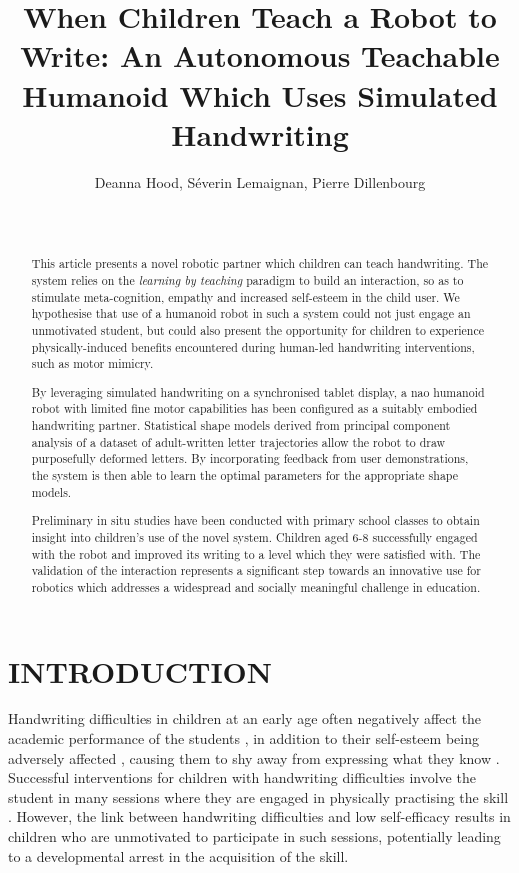 \documentclass{sig-alternate}
\title{When Children Teach a Robot to Write: An Autonomous Teachable Humanoid Which Uses Simulated Handwriting
}
\author{
\alignauthor
Deanna Hood, Séverin Lemaignan, Pierre Dillenbourg\\
   \affaddr{Computer-Human Interaction in Learning and Instruction Laboratory (CHILI)}\\
   \affaddr{École Polytechnique Fédérale de Lausanne (EPFL)}\\
   \email{firstname.lastname@epfl.ch}
}
\begin{document}
\maketitle

\begin{abstract}

This article presents a novel robotic partner which children can teach
handwriting.  The system relies on the \emph{learning by teaching} paradigm to
build an interaction, so as to stimulate meta-cognition, empathy and
increased self-esteem in the child user. We hypothesise that use of a
humanoid robot in such a system could not just engage an unmotivated student,
but could also present the opportunity for children to experience
physically-induced benefits encountered during human-led handwriting
interventions, such as motor mimicry.

By leveraging simulated handwriting on a synchronised tablet display, a {\sc
nao} humanoid robot with limited fine motor capabilities has been configured as
a suitably embodied handwriting partner. Statistical shape models derived from
principal component analysis of a dataset of adult-written letter trajectories
allow the robot to draw purposefully deformed letters. By incorporating feedback
from user demonstrations, the system is then able to learn the optimal
parameters for the appropriate shape models. 

Preliminary in situ studies have been conducted with primary school classes to
obtain insight into children's use of the novel system.  Children aged 6-8
successfully engaged with the robot and improved its writing to a level which
they were satisfied with. The validation of the interaction represents a
significant step towards an innovative use for robotics which addresses a
widespread and socially meaningful challenge in education. 

\end{abstract}


\section{INTRODUCTION}

Handwriting difficulties in children at an early age often negatively affect the
academic performance of the students \cite{Christensen2005}, in addition to
their self-esteem being adversely affected \cite{Malloy1995}, causing them to
shy away from expressing what they know \cite{Medwell2008}.  Successful
interventions for children with handwriting difficulties involve the student in
many sessions where they are engaged in physically practising the skill
\cite{Hoy2011}. However, the link between handwriting difficulties and low
self-efficacy \cite{Engel-Yeger2009} results in children who are unmotivated to
participate in such sessions, potentially leading to a developmental arrest in
the acquisition of the skill. 
\end{document}
